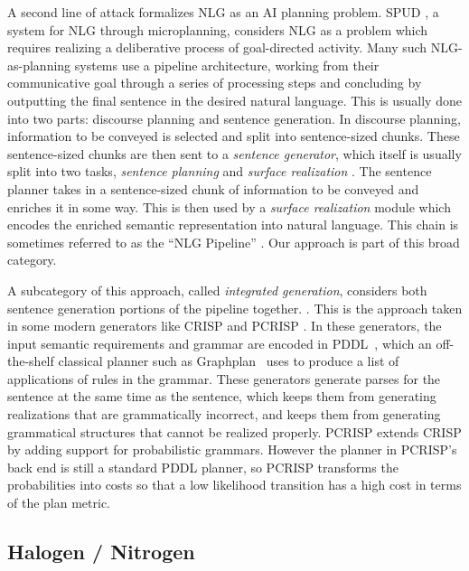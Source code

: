 A second line of attack formalizes NLG as an AI planning problem.
SPUD \cite{stone_2003_spud}, a system for NLG through microplanning,
considers NLG as a problem which requires realizing a deliberative
process of goal-directed activity.  Many such NLG-as-planning systems
use a pipeline architecture, working from their communicative goal
through a series of processing steps and concluding by outputting the
final sentence in the desired natural language. This is usually done
into two parts:
discourse planning and sentence generation. In
discourse planning, information to be conveyed is selected and split
into sentence-sized chunks. These sentence-sized chunks are then sent
to a {\em sentence generator}, which itself is usually split into two
tasks, {\em sentence planning} and {\em surface realization}
\cite{koller_experiences_2011}.  The sentence planner takes in a
sentence-sized chunk of information to be conveyed and enriches it in
some way.  This is then used by a {\em surface realization}
module which encodes the enriched semantic representation into 
 natural language.  This chain is sometimes referred to as the
``NLG Pipeline'' \cite{reiter_building_2000}.  Our approach is
part of this broad category.

A subcategory of this approach, called {\em integrated generation}, considers both
sentence generation portions of the pipeline together.
\cite{koller_sentence_2007}.  This is the approach taken in some
modern generators like CRISP \cite{koller_sentence_2007} and PCRISP
\cite{bauer_sentence_2010}.  In these generators, the input semantic
requirements and grammar are encoded in PDDL~\cite{fox2003pddl2},
which an off-the-shelf classical planner such as
Graphplan~\cite{blum_1997_graphplan} uses to produce a list of
applications of rules in the grammar.  These generators generate
parses for the sentence at the same time as the sentence, which keeps
them from generating realizations that are grammatically incorrect,
and keeps them from generating grammatical structures that cannot be
realized properly. PCRISP extends CRISP by adding support for
probabilistic grammars. However the planner in PCRISP's back end is
still a standard PDDL planner, so PCRISP transforms the probabilities
into costs so that a low likelihood transition has a high cost in
terms of the plan metric.

\subsection{Halogen / Nitrogen}

